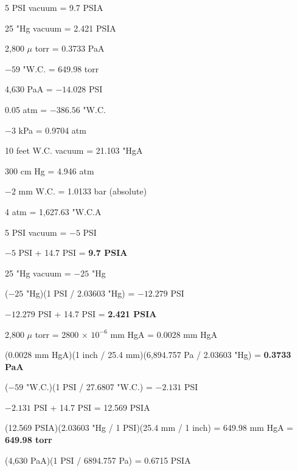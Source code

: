 {{{{{{{{{{{






\medskip
{\item{} 5 PSI vacuum = 9.7 PSIA
\vskip 5pt
{\item{} 25 "Hg vacuum = 2.421 PSIA
\vskip 5pt
{\item{} 2,800 $\mu$ torr = 0.3733 PaA
\vskip 5pt
{\item{} $-59$ "W.C. = 649.98 torr
\vskip 5pt
{\item{} 4,630 PaA = $-14.028$ PSI
\vskip 5pt
{\item{} 0.05 atm = $-386.56$ "W.C.
\vskip 5pt
{\item{} $-3$ kPa = 0.9704 atm
\vskip 5pt
{\item{} 10 feet W.C. vacuum = 21.103 "HgA
\vskip 5pt
{\item{} 300 cm Hg = 4.946 atm
\vskip 5pt
{\item{} $-2$ mm W.C. = 1.0133 bar (absolute)
\vskip 5pt
{\item{} 4 atm = 1,627.63 "W.C.A
\medskip








5 PSI vacuum = $-5$ PSI

$-5$ PSI + 14.7 PSI = {\bf 9.7 PSIA}


\vskip 10pt


25 "Hg vacuum = $-25$ "Hg

($-25$ "Hg)(1 PSI / 2.03603 "Hg) = $-12.279$ PSI

$-12.279$ PSI + 14.7 PSI = {\bf 2.421 PSIA}


\vskip 10pt


2,800 $\mu$ torr = 2800 $\times$ $10^{-6}$ mm HgA = 0.0028 mm HgA

(0.0028 mm HgA)(1 inch / 25.4 mm)(6,894.757 Pa / 2.03603 "Hg) = {\bf 0.3733 PaA}


\vskip 10pt


($-59$ "W.C.)(1 PSI / 27.6807 "W.C.) = $-2.131$ PSI

$-2.131$ PSI + 14.7 PSI = 12.569 PSIA

(12.569 PSIA)(2.03603 "Hg / 1 PSI)(25.4 mm / 1 inch) = 649.98 mm HgA = {\bf 649.98 torr}


\vskip 10pt


(4,630 PaA)(1 PSI / 6894.757 Pa) = 0.6715 PSIA

}}}}}}}}}}}}}}}}}}}}}}

